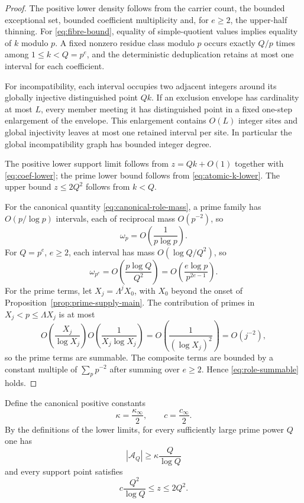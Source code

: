 \begin{proof}
The positive lower density follows from the carrier count, the bounded exceptional set, bounded coefficient multiplicity and, for $e\ge2$, the upper-half thinning.  For \eqref{eq:fibre-bound}, equality of simple-quotient values implies equality of $k$ modulo $p$.  A fixed nonzero residue class modulo $p$ occurs exactly $Q/p$ times among $1\le k<Q=p^e$, and the deterministic deduplication retains at most one interval for each coefficient.

For incompatibility, each interval occupies two adjacent integers around its globally injective distinguished point $Qk$.  If an exclusion envelope has cardinality at most $L$, every member meeting it has distinguished point in a fixed one-step enlargement of the envelope.  This enlargement contains $O(L)$ integer sites and global injectivity leaves at most one retained interval per site.  In particular the global incompatibility graph has bounded integer degree.

The positive lower support limit follows from $z=Qk+O(1)$ together with \eqref{eq:coef-lower}; the prime lower bound follows from \eqref{eq:atomic-k-lower}.  The upper bound $z\le2Q^2$ follows from $k<Q$.

For the canonical quantity \eqref{eq:canonical-role-mass}, a prime family has $O(p/\log p)$ intervals, each of reciprocal mass $O(p^{-2})$, so
\[
\omega_p=O\!\left(\frac1{p\log p}\right).
\]
For $Q=p^e$, $e\ge2$, each interval has mass $O(\log Q/Q^2)$, so
\[
\omega_{p^e}
=O\!\left(\frac{p\log Q}{Q^2}\right)
=O\!\left(\frac{e\log p}{p^{2e-1}}\right).
\]
For the prime terms, let $X_j=\Lambda^jX_0$, with $X_0$ beyond the onset of Proposition~\ref{prop:prime-supply-main}.  The contribution of primes in $X_j<p\le\Lambda X_j$ is at most
\[
O\!\left(\frac{X_j}{\log X_j}\right)
O\!\left(\frac1{X_j\log X_j}\right)
=O\!\left(\frac1{(\log X_j)^2}\right)
=O(j^{-2}),
\]
so the prime terms are summable.  The composite terms are bounded by a constant multiple of $\sum_p p^{-2}$ after summing over $e\ge2$.  Hence \eqref{eq:role-summable} holds.
\end{proof}

Define the canonical positive constants
\begin{equation}\label{eq:canonical-density-support-constants}
\kappa=\frac{\kappa_\infty}{2},
\qquad
c=\frac{c_\infty}{2}.
\end{equation}
By the definitions of the lower limits, for every sufficiently large prime power $Q$ one has
\begin{equation}\label{eq:family-size}
|\mathcal A_Q|\ge\kappa\frac Q{\log Q}
\end{equation}
and every support point satisfies
\begin{equation}\label{eq:support-window}
c\frac{Q^2}{\log Q}\le z\le2Q^2.
\end{equation}


